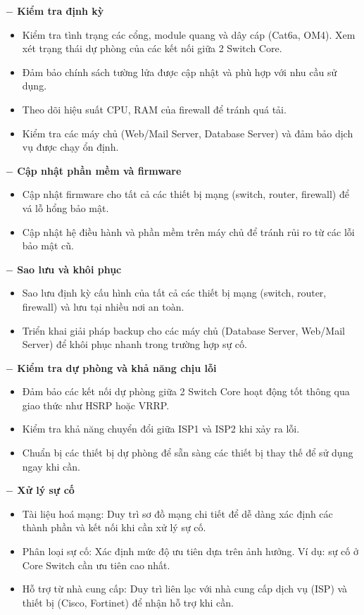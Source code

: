 \textbf{$-$ Kiểm tra định kỳ}
\begin{itemize}[left = 2cm]
    \item Kiểm tra tình trạng các cổng, module quang và dây cáp (Cat6a, OM4). Xem xét trạng thái dự phòng của các kết nối giữa 2 Switch Core.
    \item Đảm bảo chính sách tường lửa được cập nhật và phù hợp với nhu cầu sử dụng.
    \item Theo dõi hiệu suất CPU, RAM của firewall để tránh quá tải.
    \item Kiểm tra các máy chủ (Web/Mail Server, Database Server) và đảm bảo dịch vụ được chạy ổn định.
\end{itemize}

\textbf{$-$ Cập nhật phần mềm và firmware}
\begin{itemize}[left = 2cm]
    \item Cập nhật firmware cho tất cả các thiết bị mạng (switch, router, firewall) để vá lỗ hổng bảo mật.
    \item Cập nhật hệ điều hành và phần mềm trên máy chủ để tránh rủi ro từ các lỗi bảo mật cũ.
\end{itemize}

\textbf{$-$ Sao lưu và khôi phục}
\begin{itemize}[left = 2cm]
    \item Sao lưu định kỳ cấu hình của tất cả các thiết bị mạng (switch, router, firewall) và lưu tại nhiều nơi an toàn.
    \item Triển khai giải pháp backup cho các máy chủ (Database Server, Web/Mail Server) để khôi phục nhanh trong trường hợp sự cố.
\end{itemize}

\textbf{$-$ Kiểm tra dự phòng và khả năng chịu lỗi}
\begin{itemize}[left = 2cm]
    \item Đảm bảo các kết nối dự phòng giữa 2 Switch Core hoạt động tốt thông qua giao thức như HSRP hoặc VRRP.
    \item Kiểm tra khả năng chuyển đổi giữa ISP1 và ISP2 khi xảy ra lỗi.
    \item Chuẩn bị các thiết bị dự phòng để sẵn sàng các thiết bị thay thế để sử dụng ngay khi cần.
\end{itemize}

\textbf{$-$ Xử lý sự cố}
\begin{itemize}[left = 2cm]
    \item Tài liệu hoá mạng: Duy trì sơ đồ mạng chi tiết để dễ dàng xác định các thành phần và kết nối khi cần xử lý sự cố.
    \item Phân loại sự cố: Xác định mức độ ưu tiên dựa trên ảnh hưởng. Ví dụ: sự cố ở Core Switch cần ưu tiên cao nhất.
    \item Hỗ trợ từ nhà cung cấp: Duy trì liên lạc với nhà cung cấp dịch vụ (ISP) và thiết bị (Cisco, Fortinet) để nhận hỗ trợ khi cần.
\end{itemize}

